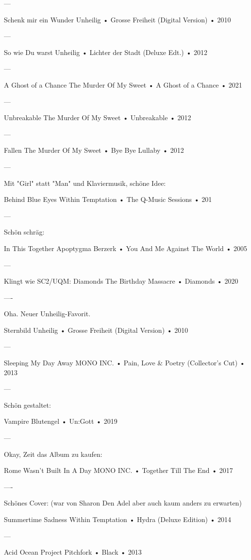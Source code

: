 —

Schenk mir ein Wunder
Unheilig
 •
Grosse Freiheit (Digital Version)
 • 2010

—

So wie Du warst
Unheilig
 •
Lichter der Stadt (Deluxe Edt.)
 •
2012


—

A Ghost of a Chance
The Murder Of My Sweet
 •
A Ghost of a Chance
 •
2021

—

Unbreakable
The Murder Of My Sweet
 •
Unbreakable
 •
2012

—

Fallen
The Murder Of My Sweet
 •
Bye Bye Lullaby
 •
2012


—

Mit "Girl" statt "Man" und Klaviermusik, schöne Idee:

Behind Blue Eyes
Within Temptation
 •
The Q-Music Sessions
 •
201


—

Schön schräg:

In This Together
Apoptygma Berzerk
 •
You And Me Against The World
 •
2005


—

Klingt wie SC2/UQM:
Diamonds
The Birthday Massacre
 •
Diamonds
 •
2020


—-

Oha. Neuer Unheilig-Favorit.

Sternbild
Unheilig
 •
Grosse Freiheit (Digital Version)
 •
2010


—

Sleeping My Day Away
MONO INC.
 •
Pain, Love & Poetry (Collector's Cut)
 •
2013


—

Schön gestaltet:

Vampire
Blutengel
 •
Un:Gott
 •
2019


—

Okay, Zeit das Album zu kaufen:

Rome Wasn't Built In A Day
MONO INC.
 •
Together Till The End
 •
2017

—-

Schönes Cover:
(war von Sharon Den Adel aber auch kaum anders zu erwarten)

Summertime Sadness
Within Temptation
 •
Hydra (Deluxe Edition)
 •
2014



—

Acid Ocean
Project Pitchfork
 •
Black
 •
2013

